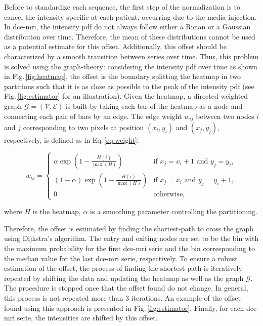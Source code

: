 Before to standardize each sequence, the first step of the normalization is to cancel the intensity specific at each patient, occurring due to the media injection.
In \ac{dce}-\ac{mri}, the intensity \ac{pdf} do not always follow either a Rician or a Gaussian distribution over time.
Therefore, the mean of these distributions cannot be used as a potential estimate for this offset.
Additionally, this offset should be characterized by a smooth transition between series over time.
Thus, this problem is solved using the graph-theory: considering the intensity \ac{pdf} over time as shown in Fig.\,\ref{fig:heatmap}, the offset is the boundary splitting the heatmap in two partitions such that it is as close as possible to the peak of the intensity \ac{pdf} (see Fig.\,\ref{fig:estimator} for an illustration).
Given the heatmap, a directed weighted graph $\mathcal{G}=(\mathcal{V}, \mathcal{E})$ is built by taking each bar of the heatmap as a node and connecting each pair of bars by an edge.
The edge weight $w_{ij}$ between two nodes $i$ and $j$ corresponding to two pixels at position $(x_i, y_i)$ and $(x_j, y_j)$, respectively, is defined as in Eq.\,\eqref{eq:weight}:

\begin{equation}
  w_{ij} = \begin{cases}
    \alpha \exp(1 - \frac{H(i)}{\max(H)})       & \text{if } x_j = x_i + 1 \text{ and } y_j = y_i, \\
    (1 - \alpha) \exp(1 - \frac{H(i)}{\max(H)}) & \text{if } x_j = x_i \text{ and } y_j = y_i + 1, \\
    0                                           & \text{otherwise},
  \end{cases}
  \label{eq:weight}
\end{equation}

\noindent where $H$ is the heatmap, $\alpha$ is a smoothing parameter controlling the partitioning.

Therefore, the offset is estimated by finding the shortest-path to cross the graph using Dijkstra's algorithm.
The entry and exiting nodes are set to be the bin with the maximum probability for the first \ac{dce}-\ac{mri} serie and the bin corresponding to the median value for the last \ac{dce}-\ac{mri} serie, respectively.
To ensure a robust estimation of the offset, the process of finding the shortest-path is iteratively repeated by shifting the data and updating the heatmap as well as the graph $\mathcal{G}$.
The procedure is stopped once that the offset found do not change.
In general, this process is not repeated more than 3 iterations.
An example of the offset found using this approach is presented in Fig.\,\ref{fig:estimator}.
Finally, for each \ac{dce}-\ac{mri} serie, the intensities are shifted by this offset.

